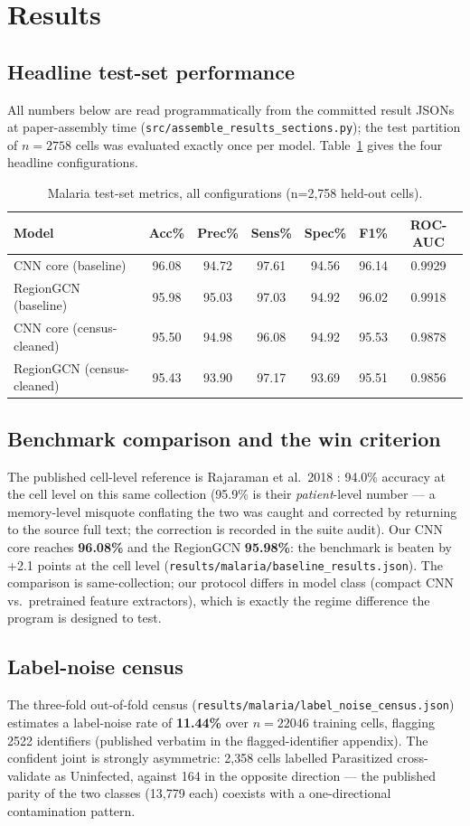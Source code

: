 
\section{Results}
\label{sec:results}
\subsection{Headline test-set performance}
All numbers below are read programmatically from the committed result JSONs
at paper-assembly time (\texttt{src/assemble\_results\_sections.py}); the
test partition of $n=2758$ cells was evaluated exactly once per
model. Table~\ref{tab:mal-main} gives the four headline configurations.
\begin{table}[h]\centering\small
\begin{tabular}{lcccccc}
\hline
Model & Acc\% & Prec\% & Sens\% & Spec\% & F1\% & ROC-AUC \\
\hline
CNN core (baseline) & 96.08 & 94.72 & 97.61 & 94.56 & 96.14 & 0.9929 \\
RegionGCN (baseline) & 95.98 & 95.03 & 97.03 & 94.92 & 96.02 & 0.9918 \\
CNN core (census-cleaned) & 95.50 & 94.98 & 96.08 & 94.92 & 95.53 & 0.9878 \\
RegionGCN (census-cleaned) & 95.43 & 93.90 & 97.17 & 93.69 & 95.51 & 0.9856 \\
\hline
\end{tabular}
\caption{Malaria test-set metrics, all configurations (n=2,758 held-out cells).}\label{tab:mal-main}
\end{table}

\subsection{Benchmark comparison and the win criterion}
The published cell-level reference is Rajaraman et al.\ 2018
\cite{rajaraman2018}: 94.0\% accuracy at the cell level on this same
collection (95.9\% is their \emph{patient}-level number --- a memory-level
misquote conflating the two was caught and corrected by returning to the
source full text; the correction is recorded in the suite audit). Our CNN
core reaches \textbf{96.08\%} and the RegionGCN
\textbf{95.98\%}: the benchmark is beaten by
+2.1 points at the cell level
(\texttt{results/malaria/baseline\_results.json}). The comparison is
same-collection; our protocol differs in model class (compact CNN vs.\
pretrained feature extractors), which is exactly the regime difference the
program is designed to test.
\subsection{Label-noise census}
The three-fold out-of-fold census
(\texttt{results/malaria/label\_noise\_census.json}) estimates a label-noise
rate of \textbf{11.44\%} over
$n=22046$ training cells, flagging 2522
identifiers (published verbatim in the flagged-identifier appendix). The
confident joint is strongly asymmetric: 2{,}358 cells labelled
Parasitized cross-validate as Uninfected, against 164 in the opposite
direction --- the published parity of the two classes (13{,}779 each)
coexists with a one-directional contamination pattern.
